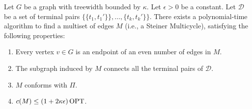 \begin{theorem}\label{dynamicProgramming}

Let \(G\) be a graph with treewidth bounded by \(\kappa\). Let \(\epsilon > 0\) be a constant. Let \(\mathcal{D}\) be a set of terminal pairs \(\{\{t_1, t_1'\}\}, \dots, \{t_k, t_k'\}\}\).
There exists a polynomial-time algorithm to find a multiset of edges \(M\) (i.e., a Steiner Multicycle), satisfying the following properties:
\begin{enumerate}
    \item Every vertex \(v \in G\) is an endpoint of an even number of edges in \(M\).
    \item The subgraph induced by \(M\) connects all the terminal pairs of \(\mathcal{D}\).
    \item \(M\) conforms with \(\Pi\).
    \item \(c(M) \leq (1 + 2 \kappa \epsilon) \operatorname{\textrm{OPT}}\).
\end{enumerate}

\end{theorem}
